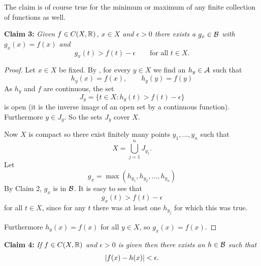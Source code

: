 The claim is of course true for the minimum or maximum of any finite
collection of functions as well.

\medskip

\noindent
\textbf{Claim 3:} \emph{Given $f \in C(X,{\mathbb{R}})$, $x \in X$ and $\epsilon > 0$
there exists a $g_x \in {\mathcal{B}}$ with $g_x(x) = f(x)$ and
}
\begin{equation*}
g_x(t) > f(t)-\epsilon \qquad \text{for all $t \in X$}.
\end{equation*}

\begin{proof}
Let $x \in X$ be fixed.
By , for every $y \in X$ we find an $h_y \in
{\mathcal{A}}$ such that
\begin{equation*}
h_y(x) = f(x), \qquad h_y(y)=f(y)
\end{equation*}
As $h_y$ and $f$ are continuous, the set
\begin{equation*}
J_y = \{ t \in X : h_y(t) > f(t) -\epsilon \}
\end{equation*}
is open (it is the inverse image of an open set by a continuous function).
Furthermore $y \in J_y$.  So the sets $J_y$ cover $X$.

Now $X$ is compact so there exist finitely many points $y_1,\ldots,y_n$ such
that
\begin{equation*}
X = \bigcup_{j=1}^n J_{y_j}  .
\end{equation*}
Let 
\begin{equation*}
g_x = \max(h_{y_1},h_{y_2},\ldots,h_{y_n})
\end{equation*}
By Claim 2, $g_x$ is in ${\mathcal{B}}$.
It is easy to see that
\begin{equation*}
g_x(t) > f(t) -\epsilon
\end{equation*}
for all $t \in X$, since for any $t$ there was at least one $h_{y_j}$ for
which this was true.

Furthermore $h_y(x) = f(x)$ for all $y \in X$, so
$g_x(x) = f(x)$.
\end{proof}

\medskip

\noindent
\textbf{Claim 4:} \emph{If $f \in C(X,{\mathbb{R}})$ and $\epsilon > 0$ is given then there
exists an $h \in {\mathcal{B}}$ such that}
\begin{equation*}
\lvert {f(x) - h(x)} \rvert < \epsilon .
\end{equation*}

